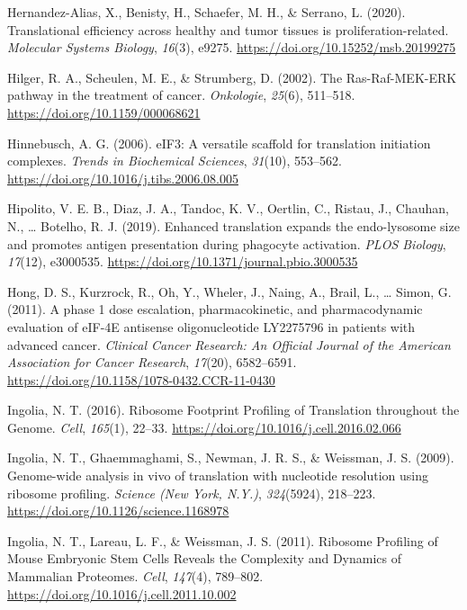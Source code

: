 \documentclass[12pt,openany]{book}
\begin{document}
\hypertarget{ref-Hernandez-Alias2020}{}
Hernandez-Alias, X., Benisty, H., Schaefer, M. H., \& Serrano, L.
(2020). Translational efficiency across healthy and tumor tissues is
proliferation-related. \emph{Molecular Systems Biology}, \emph{16}(3),
e9275. \url{https://doi.org/10.15252/msb.20199275}

\hypertarget{ref-Hilger2002}{}
Hilger, R. A., Scheulen, M. E., \& Strumberg, D. (2002). The
Ras-Raf-MEK-ERK pathway in the treatment of cancer. \emph{Onkologie},
\emph{25}(6), 511--518. \url{https://doi.org/10.1159/000068621}

\hypertarget{ref-Hinnebusch2006}{}
Hinnebusch, A. G. (2006). eIF3: A versatile scaffold for translation
initiation complexes. \emph{Trends in Biochemical Sciences},
\emph{31}(10), 553--562.
\url{https://doi.org/10.1016/j.tibs.2006.08.005}

\hypertarget{ref-Hipolito2019}{}
Hipolito, V. E. B., Diaz, J. A., Tandoc, K. V., Oertlin, C., Ristau, J.,
Chauhan, N., \ldots{} Botelho, R. J. (2019). Enhanced translation
expands the endo-lysosome size and promotes antigen presentation during
phagocyte activation. \emph{PLOS Biology}, \emph{17}(12), e3000535.
\url{https://doi.org/10.1371/journal.pbio.3000535}

\hypertarget{ref-Hong2011}{}
Hong, D. S., Kurzrock, R., Oh, Y., Wheler, J., Naing, A., Brail, L.,
\ldots{} Simon, G. (2011). A phase 1 dose escalation, pharmacokinetic,
and pharmacodynamic evaluation of eIF-4E antisense oligonucleotide
LY2275796 in patients with advanced cancer. \emph{Clinical Cancer
Research: An Official Journal of the American Association for Cancer
Research}, \emph{17}(20), 6582--6591.
\url{https://doi.org/10.1158/1078-0432.CCR-11-0430}

\hypertarget{ref-Ingolia2016}{}
Ingolia, N. T. (2016). Ribosome Footprint Profiling of Translation
throughout the Genome. \emph{Cell}, \emph{165}(1), 22--33.
\url{https://doi.org/10.1016/j.cell.2016.02.066}

\hypertarget{ref-Ingolia2009}{}
Ingolia, N. T., Ghaemmaghami, S., Newman, J. R. S., \& Weissman, J. S.
(2009). Genome-wide analysis in vivo of translation with nucleotide
resolution using ribosome profiling. \emph{Science (New York, N.Y.)},
\emph{324}(5924), 218--223.
\url{https://doi.org/10.1126/science.1168978}

\hypertarget{ref-Ingolia2011}{}
Ingolia, N. T., Lareau, L. F., \& Weissman, J. S. (2011). Ribosome
Profiling of Mouse Embryonic Stem Cells Reveals the Complexity and
Dynamics of Mammalian Proteomes. \emph{Cell}, \emph{147}(4), 789--802.
\url{https://doi.org/10.1016/j.cell.2011.10.002}
\end{document}
